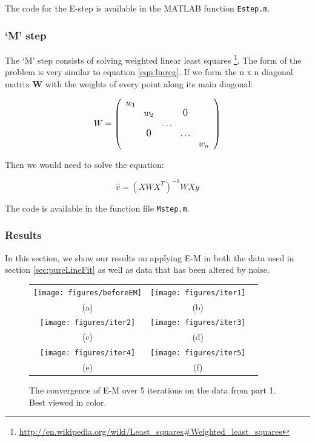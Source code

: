 \documentclass[11pt]{article} %
\begin{document}
The code for the E-step is available in the MATLAB function \texttt{Estep.m}.

\subsubsection{`M' step}

The `M' step consists of solving weighted linear least squares \footnote{\url{http://en.wikipedia.org/wiki/Least_squares\#Weighted_least_squares}}. The form of the problem is very similar to equation \ref{eqn:linreg}. If we form the n x n diagonal matrix $\mathbf{W}$ with the weights of every point along its main diagonal:

\[ W = 
\left(
 \begin{array}{ccccc}
   \tiny{w_1}\\
    & \tiny{w_2} & & \text{\large0}\\
    & & \dots\\
    & \text{\large0} & & \dots\\
    & & & & \tiny{w_n}
 \end{array}
\right)
\]

Then we would need to solve the equation:

\begin{equation}
	\hat{v} = (X W X^T) ^{-1}  WXy
	\label{eqn:wlsq}
\end{equation}

The code is available in the function file \texttt{Mstep.m}.

\subsubsection{Results}

In this section, we show our results on applying E-M in both the data used in section \ref{sec:pureLineFit} as well as data that has been altered by noise.

\begin{figure}[H]
	\centering
	\begin{tabular}{c c c}
		\texttt{[image: figures/beforeEM]} & \texttt{[image: figures/iter1]} \\
		(a) & (b) \\
		\texttt{[image: figures/iter2]} & \texttt{[image: figures/iter3]} \\ 
		(c) & (d) \\
		\texttt{[image: figures/iter4]} & \texttt{[image: figures/iter5]} \\ 				
		(e) & (f) 
	\end{tabular}
	\caption{The convergence of E-M over 5 iterations on the data from part 1. Best viewed in color.}
	\label{fig:EM-conv}
\end{figure}
\end{document}
